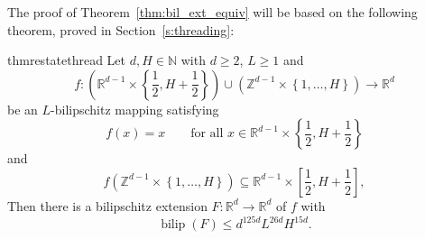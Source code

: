 \documentclass[a4paper, bibliography=totoc]{scrartcl}
\numberwithin{claimcounter}{define}
\newcommand{\R}{\mathbb{R}}
\newcommand{\Z}{\mathbb{Z}}
\newcommand{\N}{\mathbb{N}}
\newcommand{\bilip}{\operatorname{bilip}}
\newcommand{\set}[1]{\left\{#1\right\}}
\newcommand{\br}[1]{\left(#1\right)}
\newcommand{\sqbr}[1]{\left[#1\right]}
\begin{document}
The proof of Theorem~\ref{thm:bil_ext_equiv} will be based on the following theorem, proved in Section~\ref{s:threading}:
\begin{restatable*}{thm}{restatethread}\label{thm:thread}
	Let $d,H\in\N$ with $d\geq 2$, $L\geq 1$ and 
	\begin{equation*}
	f\colon \br{\R^{d-1}\times\set{\frac{1}{2},H+\frac{1}{2}}}\cup\br{\Z^{d-1}\times\set{1,\ldots,H}}\to\R^{d}
	\end{equation*}
	be an $L$-bilipschitz mapping satisfying
	\begin{equation*}
	f(x)=x\qquad \text{for all }x\in \R^{d-1}\times \set{\frac{1}{2},H+\frac{1}{2}}
	\end{equation*} 
	and
	\begin{equation*}
	f\br{\Z^{d-1}\times\set{1,\ldots,H}}\subseteq \R^{d-1}\times\sqbr{\frac{1}{2},H+\frac{1}{2}},
	\end{equation*}
	Then there is a bilipschitz extension $F\colon\R^{d}\to \R^{d}$ of $f$ with
	\begin{equation*}
	\bilip(F)\leq d^{125d}L^{26d}H^{15d}.
	\end{equation*}
\end{restatable*}
\end{document}
